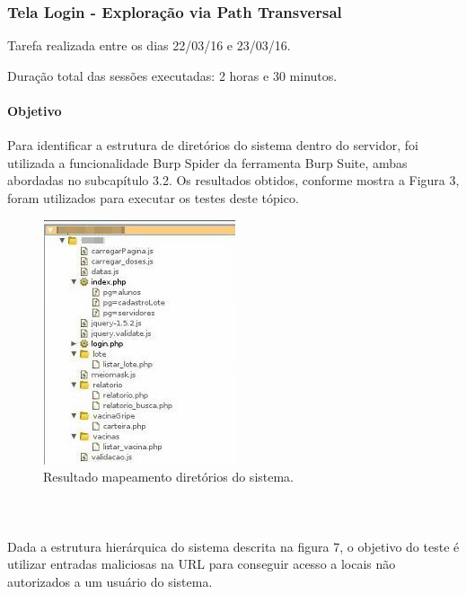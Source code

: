 \documentclass[
    12pt,               %
    openright,          %
    oneside,            %
    a4paper,            %
    section=TITLE,     %
    english,            %
    french,             %
    spanish,            %
    brazil              %
    ]{abntex2}
\begin{document}
\subsubsection*{Tela Login - Exploração via Path Transversal}

Tarefa realizada entre os dias 22/03/16 e 23/03/16.


Duração total das sessões executadas: 2 horas e 30 minutos.



\paragraph*{Objetivo}

Para identificar a estrutura de diretórios do sistema dentro do servidor, foi utilizada a funcionalidade Burp Spider da ferramenta Burp Suite, ambas abordadas no subcapítulo 3.2. Os resultados obtidos, conforme mostra a Figura 3, foram utilizados para executar os testes deste tópico.





\begin{figure}[htp]
\centering
\caption{Resultado mapeamento diretórios do sistema.}
\includegraphics[width=215px]{imagem2Editada.jpeg}
\end{figure}
\ifdefined\FloatBarrier \FloatBarrier \fi



\paragraph*{~}

Dada a estrutura hierárquica do sistema descrita na figura 7, o objetivo do teste é utilizar entradas maliciosas na URL para conseguir acesso a locais não autorizados a um usuário do sistema.
\end{document}
